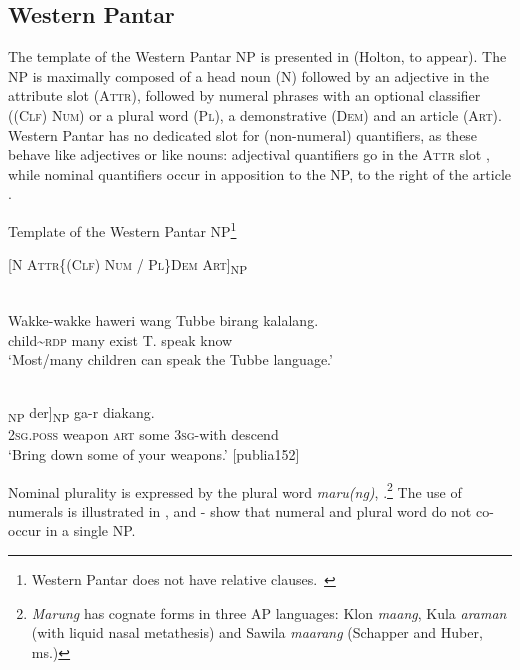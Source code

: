 \subsection{Western Pantar}  %
\label{sec:9:3.1}
The template of the Western Pantar NP is presented in  (Holton, to appear). The NP is maximally composed of a head noun (N) followed by an adjective in the attribute slot (\textsc{Attr),} followed by numeral phrases with an optional classifier (\textsc{(Clf)} \textsc{Num)} or a plural word (\textsc{Pl),} a demonstrative \textsc{(Dem)} and an article \textsc{(Art)}. Western Pantar has no dedicated slot for (non-numeral) quantifiers, as these behave like adjectives or like nouns: adjectival quantifiers go in the A\textsc{ttr} slot , while nominal quantifiers occur in apposition to the NP, to the right of the article .

\ea\label{ex:9:12}
Template of the Western Pantar NP\footnote{  Western Pantar does not have relative clauses.~}

 [\textsc{N  Attr\{(Clf) Num / Pl\}Dem  Art]}\textsc{\textsubscript{NP}}
 
\z


\ea%
\label{ex:9:13}
 \\
\gll  Wakke-wakke haweri wang Tubbe birang kalalang. \\
   child\~{}\textsc{rdp} many exist T. speak know  \\
\glt `Most/many children can speak the Tubbe language.'
\z







\ea%
\label{ex:9:14}
 \\
\gll [[{Hai} bloppa sing]\textsubscript{NP} {der}]\textsubscript{NP} ga-r diakang.  \\
  \textsc{2sg.poss} weapon \textsc{art} some 3\textsc{sg-}with descend  \\
\glt `Bring down some of your weapons.' [publia152]
\z






Nominal plurality is expressed by the plural word \textit{maru(ng)}, .\footnote{  \textit{Marung} has cognate forms in three AP languages: Klon \textit{maang}, Kula \textit{araman} (with liquid nasal metathesis) and Sawila \textit{maarang} (Schapper and Huber, ms.)} The use of numerals is illustrated in , and - show that numeral and plural word do not co-occur in a single NP.


